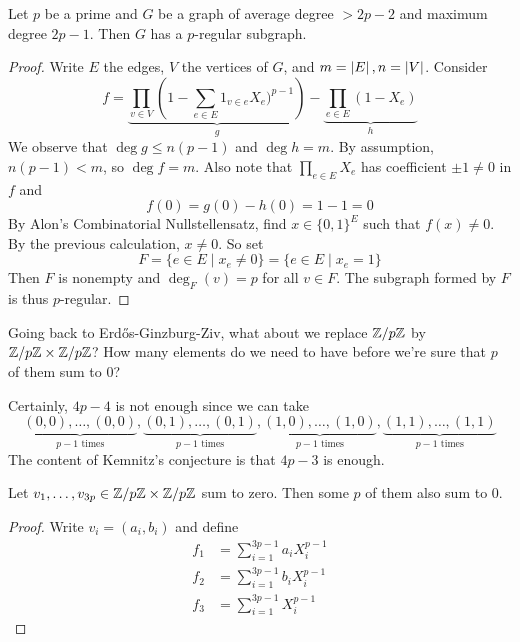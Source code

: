 \documentclass{article}
\begin{document}
\begin{nthm}
  Let $p$ be a prime and $G$ be a graph of average degree $> 2p - 2$ and maximum degree $2p - 1$. Then $G$ has a $p$-regular subgraph.
\end{nthm}
\begin{proof}
  Write $E$ the edges, $V$ the vertices of $G$, and $m = \left\lvert E\right\rvert, n = \left\lvert V\right\rvert$. Consider
  $$f = \underbrace{\prod_{v \in V} \left(1 - \sum_{e \in E} 1_{v \in e} X_e)^{p - 1}\right)}_g - \underbrace{\prod_{e \in E} (1 - X_e)}_h$$
  We observe that $\deg g \le n(p - 1)$ and $\deg h = m$. By assumption, $n(p - 1) < m$, so $\deg f = m$. Also note that $\prod_{e \in E} X_e$ has coefficient $\pm 1 \ne 0$ in $f$ and
  $$f(0) = g(0) - h(0) = 1 - 1 = 0$$
  By Alon's Combinatorial Nullstellensatz, find $x \in \{0, 1\}^E$ such that $f(x) \ne 0$. By the previous calculation, $x \ne 0$. So set
  $$F = \{e \in E \mid x_e \ne 0\} = \{e \in E \mid x_e = 1\}$$
  Then $F$ is nonempty and $\deg_F(v) = p$ for all $v \in F$. The subgraph formed by $F$ is thus $p$-regular.
\end{proof}

Going back to Erd\H os-Ginzburg-Ziv, what about we replace $\mathbb Z/p\mathbb Z$ by $\mathbb Z/p\mathbb Z \times \mathbb Z/p\mathbb Z$? How many elements do we need to have before we're sure that $p$ of them sum to $0$?

Certainly, $4p - 4$ is not enough since we can take
$$\underbrace{(0, 0), \dots, (0, 0)}_{p - 1\text{ times}}, \underbrace{(0, 1), \dots, (0, 1)}_{p - 1\text{ times}}, \underbrace{(1, 0), \dots, (1, 0)}_{p - 1\text{ times}}, \underbrace{(1, 1), \dots, (1, 1)}_{p - 1\text{ times}}$$
The content of Kemnitz's conjecture is that $4p - 3$ is enough.

\begin{nthm}
  Let $v_1, \dots, v_{3p} \in \mathbb Z/p\mathbb Z \times \mathbb Z/p\mathbb Z$ sum to zero. Then some $p$ of them also sum to $0$.
\end{nthm}
\begin{proof}
  Write $v_i = (a_i, b_i)$ and define
  \begin{align*}
  f_1 & = \sum_{i = 1}^{3p - 1} a_i X_i^{p - 1} \\
  f_2 & = \sum_{i = 1}^{3p - 1} b_i X_i^{p - 1} \\
  f_3 & = \sum_{i = 1}^{3p - 1} X_i^{p - 1}
  \end{align*}
\end{proof}
\end{document}
